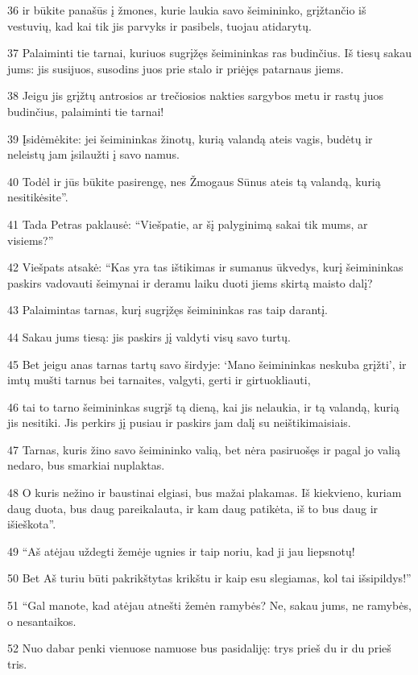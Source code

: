 \par 36 ir būkite panašūs į žmones, kurie laukia savo šeimininko, grįžtančio iš vestuvių, kad kai tik jis parvyks ir pasibels, tuojau atidarytų. 
\par 37 Palaiminti tie tarnai, kuriuos sugrįžęs šeimininkas ras budinčius. Iš tiesų sakau jums: jis susijuos, susodins juos prie stalo ir priėjęs patarnaus jiems. 
\par 38 Jeigu jis grįžtų antrosios ar trečiosios nakties sargybos metu ir rastų juos budinčius, palaiminti tie tarnai! 
\par 39 Įsidėmėkite: jei šeimininkas žinotų, kurią valandą ateis vagis, budėtų ir neleistų jam įsilaužti į savo namus. 
\par 40 Todėl ir jūs būkite pasirengę, nes Žmogaus Sūnus ateis tą valandą, kurią nesitikėsite”. 
\par 41 Tada Petras paklausė: “Viešpatie, ar šį palyginimą sakai tik mums, ar visiems?” 
\par 42 Viešpats atsakė: “Kas yra tas ištikimas ir sumanus ūkvedys, kurį šeimininkas paskirs vadovauti šeimynai ir deramu laiku duoti jiems skirtą maisto dalį? 
\par 43 Palaimintas tarnas, kurį sugrįžęs šeimininkas ras taip darantį. 
\par 44 Sakau jums tiesą: jis paskirs jį valdyti visų savo turtų. 
\par 45 Bet jeigu anas tarnas tartų savo širdyje: ‘Mano šeimininkas neskuba grįžti’, ir imtų mušti tarnus bei tarnaites, valgyti, gerti ir girtuokliauti, 
\par 46 tai to tarno šeimininkas sugrįš tą dieną, kai jis nelaukia, ir tą valandą, kurią jis nesitiki. Jis perkirs jį pusiau ir paskirs jam dalį su neištikimaisiais. 
\par 47 Tarnas, kuris žino savo šeimininko valią, bet nėra pasiruošęs ir pagal jo valią nedaro, bus smarkiai nuplaktas. 
\par 48 O kuris nežino ir baustinai elgiasi, bus mažai plakamas. Iš kiekvieno, kuriam daug duota, bus daug pareikalauta, ir kam daug patikėta, iš to bus daug ir išieškota”. 
\par 49 “Aš atėjau uždegti žemėje ugnies ir taip noriu, kad ji jau liepsnotų! 
\par 50 Bet Aš turiu būti pakrikštytas krikštu ir kaip esu slegiamas, kol tai išsipildys!” 
\par 51 “Gal manote, kad atėjau atnešti žemėn ramybės? Ne, sakau jums, ne ramybės, o nesantaikos. 
\par 52 Nuo dabar penki vienuose namuose bus pasidaliję: trys prieš du ir du prieš tris. 

